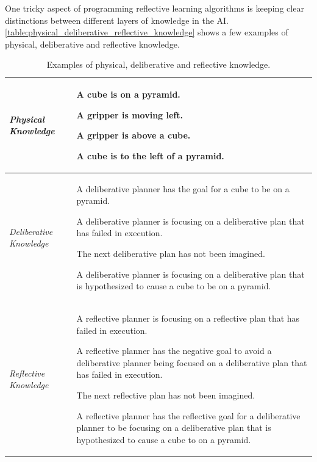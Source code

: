 One tricky aspect of programming reflective learning algorithms is
keeping clear distinctions between different layers of knowledge in
the AI.  {\autoref{table:physical_deliberative_reflective_knowledge}}
shows a few examples of physical, deliberative and reflective
knowledge.
\begin{table}
\centering
\begin{tabular}{|p{2cm}|p{8cm}|}
\hline \emph{Physical Knowledge} & \begin{packed_itemize}
\item{A cube is on a pyramid.}
\item{A gripper is moving left.}
\item{A gripper is above a cube.}
\item{A cube is to the left of a pyramid.}
\end{packed_itemize} \\
\hline \emph{Deliberative Knowledge} & \begin{packed_itemize}
\item{A deliberative planner has the goal for a cube to be on a
  pyramid.}
\item{A deliberative planner is focusing on a deliberative plan that
  has failed in execution.}
\item{The next deliberative plan has not been imagined.}
\item{A deliberative planner is focusing on a deliberative plan that
  is hypothesized to cause a cube to be on a pyramid.}
\end{packed_itemize} \\
\hline \emph{Reflective Knowledge}   & \begin{packed_itemize}
\item{A reflective planner is focusing on a reflective plan that has
  failed in execution.}
\item{A reflective planner has the negative goal to avoid a
  deliberative planner being focused on a deliberative plan that has
  failed in execution.}
\item{The next reflective plan has not been imagined.}
\item{A reflective planner has the reflective goal for a deliberative
  planner to be focusing on a deliberative plan that is hypothesized
  to cause a cube to on a pyramid.}
\end{packed_itemize} \\
\hline
\end{tabular}
\caption{Examples of physical, deliberative and reflective knowledge.}
\label{table:physical_deliberative_reflective_knowledge}
\end{table}
